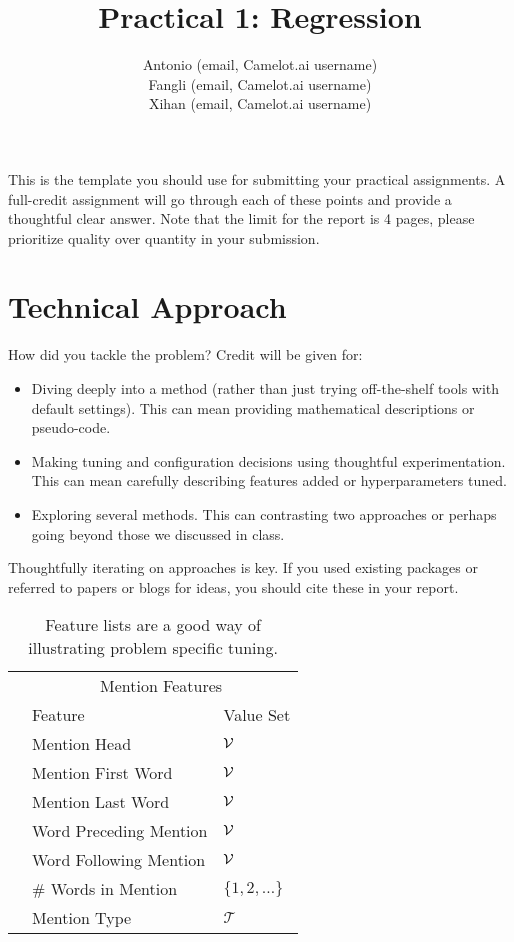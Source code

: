 \documentclass[11pt]{article}
\title{Practical 1: Regression}
\author{Antonio (email, Camelot.ai username) \\
	Fangli (email, Camelot.ai username) \\
	Xihan (email, Camelot.ai username)}
\begin{document}
\maketitle{}


\noindent This is the template you should use for submitting your practical assignments. 
A full-credit assignment will go through each of these points and provide a thoughtful 
clear answer.  Note that the limit for the report is 4 pages, please prioritize quality over 
quantity in your submission.

\section{Technical Approach}

How did you tackle the problem? Credit will be given for:

  \begin{itemize}
  \item Diving deeply into a method (rather than just trying
    off-the-shelf tools with default settings). This can mean 
    providing mathematical descriptions or pseudo-code.
  \item Making tuning and configuration decisions using thoughtful experimentation.  
    This can mean carefully describing features added or hyperparameters tuned.
  \item Exploring several methods. This can contrasting two approaches
    or perhaps going beyond those we discussed in class.
  \end{itemize}

  \noindent Thoughtfully iterating on approaches is key.
  If you used existing packages or referred to papers or blogs for ideas,
  you should cite these in your report. 

  \begin{table}
    \centering
    \begin{tabular}{@{}lll@{}}
      &\multicolumn{2}{c}{Mention Features  } \\
      & Feature & Value Set\\
      \midrule
      & Mention Head & $\mathcal{V}$ \\
      & Mention First Word & $\mathcal{V}$ \\
      & Mention Last Word & $\mathcal{V}$ \\
      & Word Preceding Mention & $\mathcal{V}$ \\
      & Word Following Mention & $\mathcal{V}$\\
      & \# Words in Mention & $\{1, 2, \ldots \}$ \\
      & Mention Type & $\mathcal{T}$ \\
      \bottomrule
      
    \end{tabular}
    \caption{Feature lists are a good way of illustrating problem specific tuning.}
  \end{table}
\end{document}
